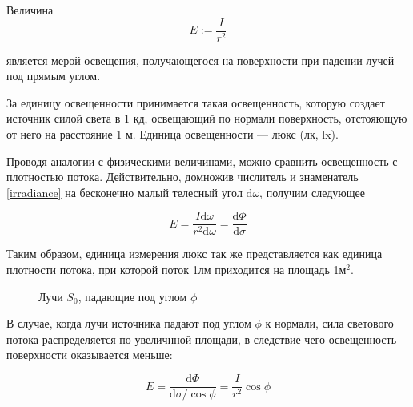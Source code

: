 \documentclass[12pt]{article}
\def\d{ \mathrm{d} }
\begin{document}
Величина
\begin{equation}\label{irradiance}
  E:=\frac{I}{r^2}
\end{equation}

является мерой освещения, получающегося на поверхности при падении лучей под прямым углом.

За единицу освещенности принимается такая освещенность, которую создает
источник силой света в 1 кд, освещающий по нормали поверхность,
отстояющую от него на расстояние 1 м. Единица освещенности — люкс (лк, lx).

Проводя аналогии с физическими величинами, можно сравнить освещенность с плотностью потока.
Действительно, домножив числитель и знаменатель \eqref{irradiance} на бесконечно малый телесный
угол $\d\omega$, получим следующее

\[E=\frac{I\d\omega}{r^2\d\omega}=\frac{\d\Phi}{\d\sigma}\]

Таким образом, единица измерения люкс так же представляется как единица плотности потока,
при которой поток 1лм приходится на площадь 1м$^2$.

\begin{figure}[h]
  \begin{center}
    \caption{Лучи $S_0$, падающие под углом $\phi$}
  \end{center}
\end{figure}

В случае, когда лучи источника падают под углом $\phi$ к нормали, сила светового
потока распределяется по увеличнной площади, в следствие чего освещенность поверхности
оказывается меньше:

\begin{equation}
  E=\frac{\d\Phi}{\d\sigma/\cos\phi}=\frac{I}{r^2}\cos\phi
\end{equation}
\end{document}
